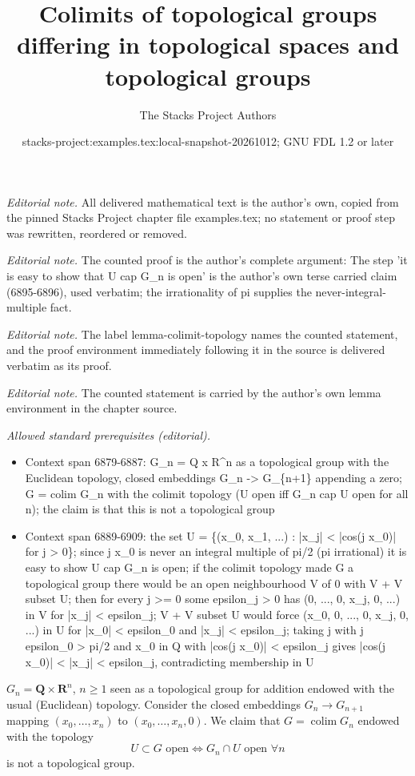 \documentclass[10pt,a4paper]{amsart}
\title{Colimits of topological groups differing in topological spaces and topological groups}
\author{The Stacks Project Authors}
\date{stacks-project:examples.tex:local-snapshot-20261012; GNU FDL 1.2 or later}
\theoremstyle{plain}
\theoremstyle{definition}
\theoremstyle{remark}
\numberwithin{equation}{subsection}
\def\colim{\mathop{\mathrm{colim}}\nolimits}
\begin{document}
\maketitle
\noindent\textit{Editorial note.} All delivered mathematical text is the author's own, copied from the pinned Stacks Project chapter file examples.tex; no statement or proof step was rewritten, reordered or removed.\par\medskip
\noindent\textit{Editorial note.} The counted proof is the author's complete argument: The step 'it is easy to show that U cap G\_n is open' is the author's own terse carried claim (6895-6896), used verbatim; the irrationality of pi supplies the never-integral-multiple fact.\par\medskip
\noindent\textit{Editorial note.} The label lemma-colimit-topology names the counted statement, and the proof environment immediately following it in the source is delivered verbatim as its proof.\par\medskip
\noindent\textit{Editorial note.} The counted statement is carried by the author's own lemma environment in the chapter source.\par\medskip
\noindent\textit{Allowed standard prerequisites (editorial).}\begin{itemize}
\item Context span 6879-6887: G\_n = Q x R\textasciicircum{}n as a topological group with the Euclidean topology, closed embeddings G\_n -> G\_\{n+1\} appending a zero; G = colim G\_n with the colimit topology (U open iff G\_n cap U open for all n); the claim is that this is not a topological group
\item Context span 6889-6909: the set U = \{(x\_0, x\_1, ...) : |x\_j| < |cos(j x\_0)| for j > 0\}; since j x\_0 is never an integral multiple of pi/2 (pi irrational) it is easy to show U cap G\_n is open; if the colimit topology made G a topological group there would be an open neighbourhood V of 0 with V + V subset U; then for every j >= 0 some epsilon\_j > 0 has (0, ..., 0, x\_j, 0, ...) in V for |x\_j| < epsilon\_j; V + V subset U would force (x\_0, 0, ..., 0, x\_j, 0, ...) in U for |x\_0| < epsilon\_0 and |x\_j| < epsilon\_j; taking j with j epsilon\_0 > pi/2 and x\_0 in Q with |cos(j x\_0)| < epsilon\_j gives |cos(j x\_0)| < |x\_j| < epsilon\_j, contradicting membership in U
\end{itemize}\medskip
$G_n = \mathbf{Q} \times \mathbf{R}^n$, $n \geq 1$ seen as a topological group
for addition endowed with the usual (Euclidean) topology. Consider the closed
embeddings $G_n \to G_{n + 1}$ mapping $(x_0, \ldots, x_n)$ to
$(x_0, \ldots, x_n, 0)$. We claim that $G = \colim G_n$ endowed with the
topology
$$
U \subset G\text{ open} \Leftrightarrow G_n \cap U\text{ open }\forall n
$$
is not a topological group.
\end{document}
